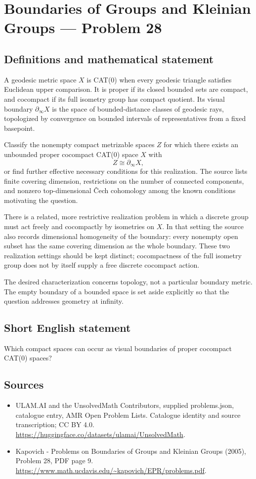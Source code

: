 \documentclass[11pt,a4paper]{article}
\begin{document}
\section*{Boundaries of Groups and Kleinian Groups — Problem 28}\label{statement}

\subsection{Definitions and mathematical statement}
A geodesic metric space $X$ is CAT(0) when every geodesic triangle satisfies Euclidean upper comparison. It is proper if its closed bounded sets are compact, and cocompact if its full isometry group has compact quotient. Its visual boundary $\partial_\infty X$ is the space of bounded-distance classes of geodesic rays, topologized by convergence on bounded intervals of representatives from a fixed basepoint.

Classify the nonempty compact metrizable spaces $Z$ for which there exists an unbounded proper cocompact CAT(0) space $X$ with
\[
 Z\cong\partial_\infty X,
\]
or find further effective necessary conditions for this realization. The source lists finite covering dimension, restrictions on the number of connected components, and nonzero top-dimensional \v{C}ech cohomology among the known conditions motivating the question.

There is a related, more restrictive realization problem in which a discrete group must act freely and cocompactly by isometries on $X$. In that setting the source also records dimensional homogeneity of the boundary: every nonempty open subset has the same covering dimension as the whole boundary. These two realization settings should be kept distinct; cocompactness of the full isometry group does not by itself supply a free discrete cocompact action.

The desired characterization concerns topology, not a particular boundary metric. The empty boundary of a bounded space is set aside explicitly so that the question addresses geometry at infinity.
\subsection{Short English statement}
Which compact spaces can occur as visual boundaries of proper cocompact CAT(0) spaces?
\subsection{Sources}
\begin{itemize}
\item[S1] ULAM.AI and the UnsolvedMath Contributors, supplied problems.json, catalogue entry, AMR Open Problem Lists. Catalogue identity and source transcription; CC BY 4.0.
\url{https://huggingface.co/datasets/ulamai/UnsolvedMath}.
\item[S2] Kapovich - Problems on Boundaries of Groups and Kleinian Groups (2005), Problem 28, PDF page 9. 
\url{https://www.math.ucdavis.edu/~kapovich/EPR/problems.pdf}.
\end{itemize}
\end{document}
